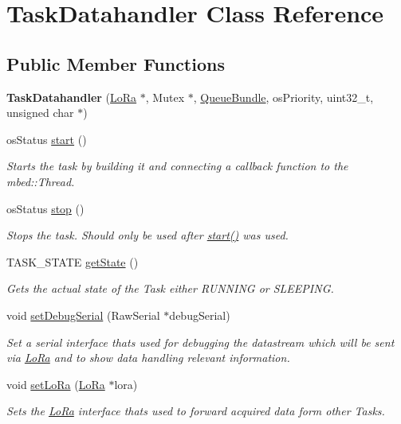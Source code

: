 \hypertarget{class_task_datahandler}{}\section{Task\+Datahandler Class Reference}
\label{class_task_datahandler}
\subsection*{Public Member Functions}
\begin{DoxyCompactItemize}
\item 
\hypertarget{class_task_datahandler_a922e19fd09eeae8f51ae0745606abea7}{}{\bfseries Task\+Datahandler} (\hyperlink{class_lo_ra}{Lo\+Ra} $\ast$, Mutex $\ast$, \hyperlink{struct_queue_bundle}{Queue\+Bundle}, os\+Priority, uint32\+\_\+t, unsigned char $\ast$)\label{class_task_datahandler_a922e19fd09eeae8f51ae0745606abea7}

\item 
os\+Status \hyperlink{class_task_datahandler_a4643728911a09ec5af8f81bf92205f12}{start} ()
\begin{DoxyCompactList}\small\item\em Starts the task by building it and connecting a callback function to the mbed\+::\+Thread. \end{DoxyCompactList}\item 
os\+Status \hyperlink{class_task_datahandler_a3bc8f0d70fab0912ee18273f046b518c}{stop} ()
\begin{DoxyCompactList}\small\item\em Stops the task. Should only be used after \hyperlink{class_task_datahandler_a4643728911a09ec5af8f81bf92205f12}{start()} was used. \end{DoxyCompactList}\item 
T\+A\+S\+K\+\_\+\+S\+T\+A\+T\+E \hyperlink{class_task_datahandler_ac4bda2270d38cd1ae75fe64f0c8c0c79}{get\+State} ()
\begin{DoxyCompactList}\small\item\em Gets the actual state of the Task either R\+U\+N\+N\+I\+N\+G or S\+L\+E\+E\+P\+I\+N\+G. \end{DoxyCompactList}\item 
void \hyperlink{class_task_datahandler_aec7afb68edd2d6b9e53c71734bee772b}{set\+Debug\+Serial} (Raw\+Serial $\ast$debug\+Serial)
\begin{DoxyCompactList}\small\item\em Set a serial interface thats used for debugging the datastream which will be sent via \hyperlink{class_lo_ra}{Lo\+Ra} and to show data handling relevant information. \end{DoxyCompactList}\item 
void \hyperlink{class_task_datahandler_a004dfee34db4d87834dc351c4e50e6e6}{set\+Lo\+Ra} (\hyperlink{class_lo_ra}{Lo\+Ra} $\ast$lora)
\begin{DoxyCompactList}\small\item\em Sets the \hyperlink{class_lo_ra}{Lo\+Ra} interface thats used to forward acquired data form other Tasks. \end{DoxyCompactList}\end{DoxyCompactItemize}


